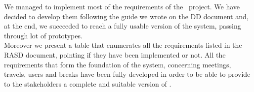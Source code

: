We managed to implement most of the requirements of the \projectname~project. We have decided to develop them following the guide we wrote on the DD document and, at the end, we succeeded to reach a fully usable version of the system, passing through lot of prototypes. \\
Moreover we present a table that enumerates all the requirements listed in the RASD document, pointing if they have been implemented or not. All the requirements that form the foundation of the system, concerning meetings, travels, users and breaks have been fully developed in order to be able to provide to the stakeholders a complete and suitable version of \projectname.

\newcommand{\reqNum}{\stepcounter{countReq}\thecountReq}

\def\arraystretch{1.5}
